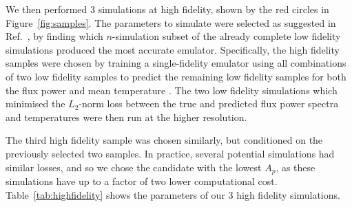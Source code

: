 \documentclass[a4paper,11pt]{article}
\begin{document}
We then performed $3$ simulations at high fidelity, shown by the red circles in Figure~\ref{fig:samples}. The parameters to simulate were selected as suggested in Ref.~\cite{Ho:2022,Fernandez:2022}, by finding which $n$-simulation subset of the already complete low fidelity simulations produced the most accurate emulator. Specifically, the high fidelity samples were chosen by training a single-fidelity emulator using all combinations of two low fidelity samples to predict the remaining low fidelity samples for both the flux power and mean temperature \cite{Ho:2022}. The two low fidelity simulations which minimised the $L_2$-norm loss between the true and predicted flux power spectra and temperatures were then run at the higher resolution.

The third high fidelity sample was chosen similarly, but conditioned on the previously selected two samples. In practice, several potential simulations had similar losses, and so we chose the candidate with the lowest $A_p$, as these simulations have up to a factor of two lower computational cost.
Table~\ref{tab:highfidelity} shows the parameters of our $3$ high fidelity simulations.

\end{document}
